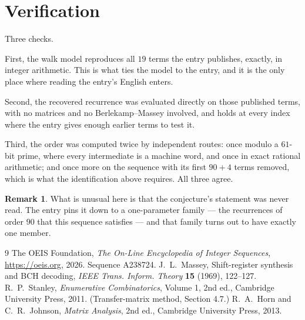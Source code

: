 \documentclass[11pt,a4paper]{article}
\theoremstyle{plain}
\theoremstyle{definition}
\newtheorem{remark}[theorem]{Remark}
\begin{document}
\section{Verification}

Three checks.

First, the walk model reproduces all $19$ terms the entry publishes, exactly, in integer
arithmetic. This is what ties the model to the entry, and it is the only place where reading
the entry's English enters.

Second, the recovered recurrence was evaluated directly on those published terms, with no
matrices and no Berlekamp--Massey involved, and holds at every index where the entry gives
enough earlier terms to test it.

Third, the order was computed twice by independent routes: once modulo a $61$-bit prime, where
every intermediate is a machine word, and once in exact rational arithmetic; and once more on
the sequence with its first $90+4$ terms removed, which is what the identification above
requires. All three agree.

\begin{remark}
What is unusual here is that the conjecture's statement was never read. The entry pins it down
to a one-parameter family --- the recurrences of order $90$ that this sequence satisfies
--- and that family turns out to have exactly one member.
\end{remark}

\begin{thebibliography}{9}
 The OEIS Foundation, \emph{The On-Line Encyclopedia of Integer
Sequences}, \url{https://oeis.org}, 2026. Sequence A238724.
 J.~L.~Massey, Shift-register synthesis and BCH decoding, \emph{IEEE
Trans. Inform. Theory} \textbf{15} (1969), 122--127.
 R.~P.~Stanley, \emph{Enumerative Combinatorics}, Volume 1, 2nd ed.,
Cambridge University Press, 2011. (Transfer-matrix method, Section 4.7.)
 R.~A.~Horn and C.~R.~Johnson, \emph{Matrix Analysis}, 2nd ed., Cambridge
University Press, 2013.
\end{thebibliography}
\end{document}
